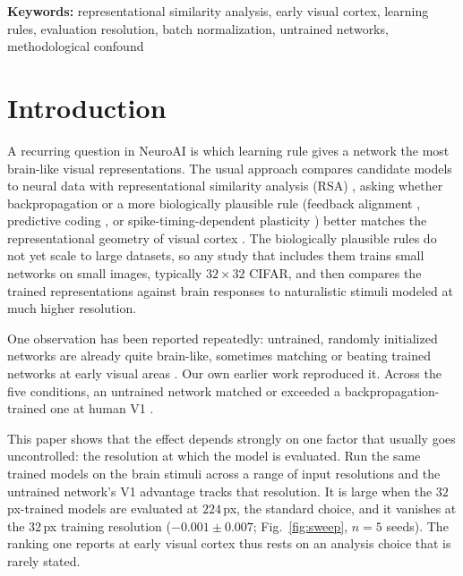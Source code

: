 \documentclass[10pt,twocolumn]{article}
\begin{document}
\begin{abstract}
data alone and is independent of any model; the second is specific to RSA on globally pooled features, and a fitted readout on the full feature map might place the models higher. What the pair bounds, then, is what this style of comparison can resolve at V1 in this dataset, not model--brain alignment in general. In this setting, the one learning effect that holds across resolution is backprop above untrained, at a higher area (LOC). Comparisons of learning rules or architectures at early visual cortex therefore need to control, and report, the evaluation resolution.
\end{abstract}

\textbf{Keywords:} representational similarity analysis, early visual cortex, learning rules, evaluation resolution, batch normalization, untrained networks, methodological confound

\section{Introduction}

A recurring question in NeuroAI is which learning rule gives a network the most brain-like visual representations. The usual approach compares candidate models to neural data with representational similarity analysis (RSA) \citep{kriegeskorte2008}, asking whether backpropagation or a more biologically plausible rule (feedback alignment \citep{lillicrap2016}, predictive coding \citep{rao1999,whittington2017}, or spike-timing-dependent plasticity \citep{bi1998,masquelier2007}) better matches the representational geometry of visual cortex \citep{yamins2016,schrimpf2020}. The biologically plausible rules do not yet scale to large datasets, so any study that includes them trains small networks on small images, typically $32\times32$ CIFAR, and then compares the trained representations against brain responses to naturalistic stimuli modeled at much higher resolution.

One observation has been reported repeatedly: untrained, randomly initialized networks are already quite brain-like, sometimes matching or beating trained networks at early visual areas \citep{saxe2011,truzzi2025}. Our own earlier work reproduced it. Across the five conditions, an untrained network matched or exceeded a backpropagation-trained one at human V1 \citep[at $224$\,px, untrained $\rho=0.076$ vs.\ backprop $\rho=0.034$; $\Delta\rho=+0.044$, $p<0.001$;][]{leutenegger2026}.

This paper shows that the effect depends strongly on one factor that usually goes uncontrolled: the resolution at which the model is evaluated. Run the same trained models on the brain stimuli across a range of input resolutions and the untrained network's V1 advantage tracks that resolution. It is large when the $32$\,px-trained models are evaluated at $224$\,px, the standard choice, and it vanishes at the $32$\,px training resolution ($-0.001 \pm 0.007$; Fig.~\ref{fig:sweep}, $n=5$ seeds). The ranking one reports at early visual cortex thus rests on an analysis choice that is rarely stated.
\end{document}
